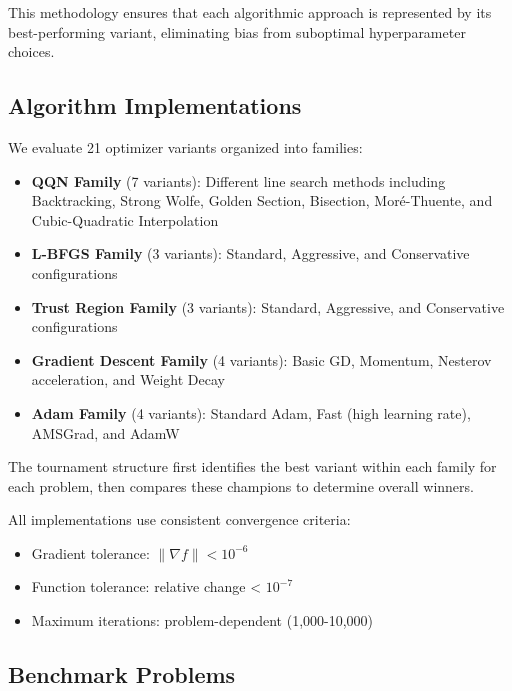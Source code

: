 This methodology ensures that each algorithmic approach is represented by its best-performing variant, eliminating bias from suboptimal hyperparameter choices.

\hypertarget{algorithm-implementations}{%
\subsection{Algorithm Implementations}\label{algorithm-implementations}}

We evaluate 21 optimizer variants organized into families:

\begin{itemize}
\tightlist
\item
  \textbf{QQN Family} (7 variants): Different line search methods including Backtracking, Strong Wolfe, Golden Section, Bisection, Moré-Thuente, and Cubic-Quadratic Interpolation
\item
  \textbf{L-BFGS Family} (3 variants): Standard, Aggressive, and Conservative configurations
\item
  \textbf{Trust Region Family} (3 variants): Standard, Aggressive, and Conservative configurations\\
\item
  \textbf{Gradient Descent Family} (4 variants): Basic GD, Momentum, Nesterov acceleration, and Weight Decay
\item
  \textbf{Adam Family} (4 variants): Standard Adam, Fast (high learning rate), AMSGrad, and AdamW
\end{itemize}

The tournament structure first identifies the best variant within each family for each problem, then compares these champions to determine overall winners.

All implementations use consistent convergence criteria:

\begin{itemize}
\tightlist
\item
  Gradient tolerance: \(\|\nabla f\| < 10^{-6}\)
\item
  Function tolerance: relative change \textless{} \(10^{-7}\)
\item
  Maximum iterations: problem-dependent (1,000-10,000)
\end{itemize}

\hypertarget{benchmark-problems}{%
\subsection{Benchmark Problems}\label{benchmark-problems}}

